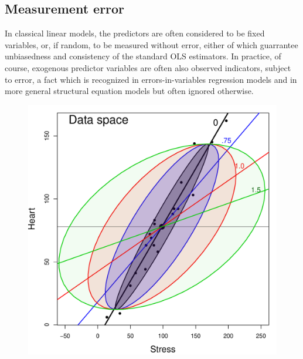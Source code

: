 \subsection{Measurement error}
In classical linear models, the predictors are often considered to be fixed
variables, or, if random, to be measured without error, either of which guarrantee
unbiasedness and consistency of the standard OLS estimators.
In practice, of course, exogenous predictor variables are often also observed
indicators, subject to error, a fact which is recognized in errors-in-variables
regression models and in more general structural equation models
but often ignored otherwise.

\begin{figure}[htb]
 \begin{minipage}[b]{.49\linewidth}
  \centering
  \includegraphics[width=1\linewidth]{fig/coffee-stress1}
 \end{minipage}%
 \hfill
 \begin{minipage}[b]{.49\linewidth}
  \centering

\end{minipage}
\end{figure}
